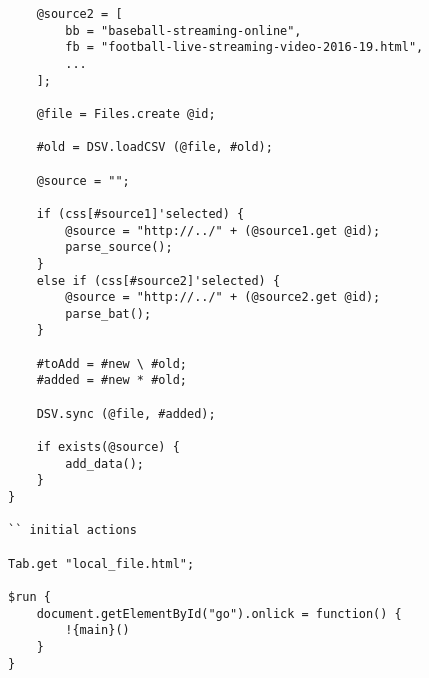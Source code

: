\begin{verbatim}
	@source2 = [
		bb = "baseball-streaming-online",
		fb = "football-live-streaming-video-2016-19.html",
		...
	];

	@file = Files.create @id;

	#old = DSV.loadCSV (@file, #old);

	@source = "";

	if (css[#source1]'selected) {
		@source = "http://../" + (@source1.get @id);
		parse_source();
	}
	else if (css[#source2]'selected) {
		@source = "http://../" + (@source2.get @id);
		parse_bat();
	}

	#toAdd = #new \ #old;
	#added = #new * #old;
	
	DSV.sync (@file, #added);

	if exists(@source) {
		add_data();
	}
}

`` initial actions

Tab.get "local_file.html";

$run {
	document.getElementById("go").onlick = function() {
		!{main}()
	}
}
\end{verbatim}
